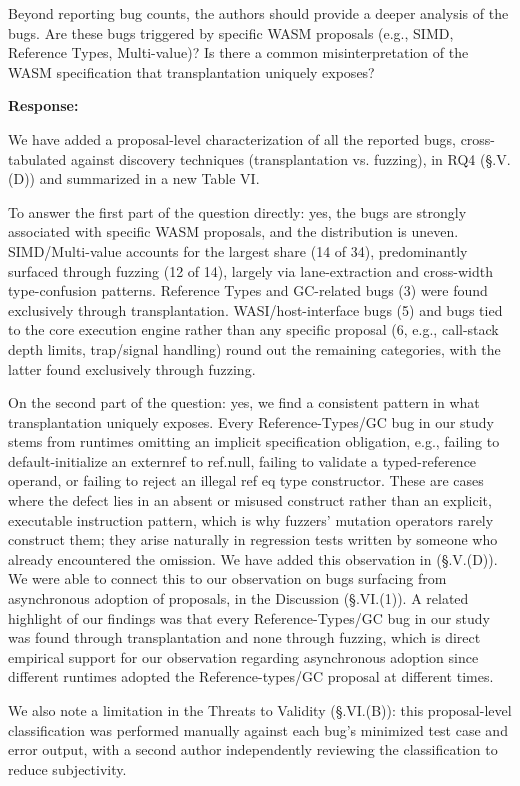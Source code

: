 \documentclass[11pt]{article}
\newenvironment{response}{%
    \par\vspace{10pt}
    \par\noindent\textbf{\color{tseblue}Response:}\par\nobreak\ignorespaces
}{%
    \par\vspace{15pt}
}
\newcounter{reviewernum}
\newcounter{cmtcounter}[reviewernum]
\newenvironment{rcomment}{%
    \stepcounter{cmtcounter}%
    \begin{revcomment}[R\thereviewernum{}.C\thecmtcounter{}.~Reviewer~\thereviewernum{}, Comment~\thecmtcounter]
}{%
    \end{revcomment}
}
\begin{document}
\begin{rcomment}
    Beyond reporting bug counts, the authors should provide a deeper analysis of the bugs. Are these bugs triggered by specific WASM proposals (e.g., SIMD, Reference Types, Multi-value)? Is there a common misinterpretation of the WASM specification that transplantation uniquely exposes?
\end{rcomment}
\begin{response}
    We have added a proposal-level characterization of all the reported bugs, cross-tabulated against discovery techniques (transplantation vs. fuzzing), in RQ4 (§.V.(D)) and summarized in a new Table VI.

    To answer the first part of the question directly: yes, the bugs are strongly associated with specific WASM proposals, and the distribution is uneven. SIMD/Multi-value accounts for the largest share (14 of 34), predominantly surfaced through fuzzing (12 of 14), largely via lane-extraction and cross-width type-confusion patterns. Reference Types and GC-related bugs (3) were found exclusively through transplantation. WASI/host-interface bugs (5) and bugs tied to the core execution engine rather than any specific proposal (6, e.g., call-stack depth limits, trap/signal handling) round out the remaining categories, with the latter found exclusively through fuzzing.

    On the second part of the question: yes, we find a consistent pattern in what transplantation uniquely exposes. Every Reference-Types/GC bug in our study stems from runtimes omitting an implicit specification obligation, e.g., failing to default-initialize an externref to ref.null, failing to validate a typed-reference operand, or failing to reject an illegal ref eq type constructor. These are cases where the defect lies in an absent or misused construct rather than an explicit, executable instruction pattern, which is why fuzzers' mutation operators rarely construct them; they arise naturally in regression tests written by someone who already encountered the omission. We have added this observation in (§.V.(D)). We were able to connect this to our observation on bugs surfacing from asynchronous adoption of proposals, in the Discussion (§.VI.(1)). A related highlight of our findings was that every Reference-Types/GC bug in our study was found through transplantation and none through fuzzing, which is direct empirical support for our observation regarding asynchronous adoption since different runtimes adopted the Reference-types/GC proposal at different times.

    We also note a limitation in the Threats to Validity (§.VI.(B)): this proposal-level classification was performed manually against each bug's minimized test case and error output, with a second author independently reviewing the classification to reduce subjectivity.

\end{response}
\end{document}
